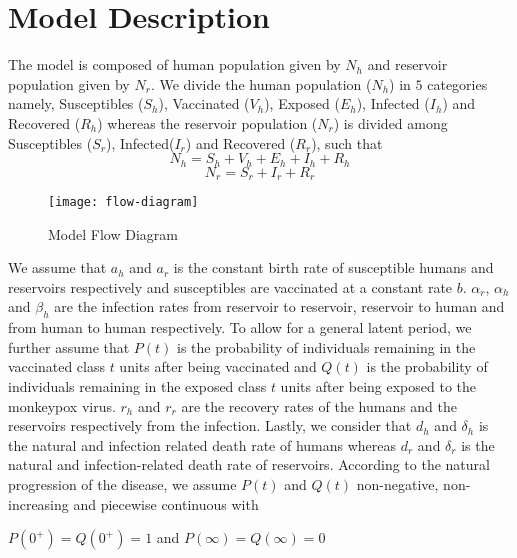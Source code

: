 \newcommand{\package}[1]{\textbf{#1}} %
\newcommand{\cmmd}[1]{\textbackslash\texttt{#1}} %


\chapter{Model Description}

The model is composed of human population given by $N_{h}$ and
reservoir population given by $N_{r}$. We divide the human population ($N_{h}$) in $5$ categories namely, Susceptibles ($S_{h}$), Vaccinated ($V_{h}$), Exposed ($E_{h}$), Infected ($I_{h}$) and Recovered ($R_{h}$) whereas the reservoir population ($N_{r}$) is divided among Susceptibles ($S_{r}$), Infected($I_{r}$) and Recovered ($R_{r}$), such that
\[N_{h} = S_{h} + V_{h} + E_{h} + I_{h} + R_{h}\]
\[N_{r} = S_{r} + I_{r} + R_{r}\]

\begin{figure}[h]
\texttt{[image: flow-diagram]}
\caption{Model Flow Diagram}
\centering
\end{figure}
We assume that $a_{h}$ and $a_{r}$ is the constant birth rate of susceptible humans and reservoirs respectively and susceptibles are vaccinated at a constant rate $b$. $\alpha_{r}$, $\alpha_{h}$ and $\beta_{h}$ are the infection rates from reservoir to reservoir, reservoir to human and from human to human respectively.
To allow for a general latent period, we further assume that $P(t)$ is the probability of individuals remaining in the vaccinated class $t$ units after being vaccinated and $Q(t)$ is the probability of individuals remaining in the exposed class $t$ units after being exposed to the monkeypox virus. $r_{h}$ and $r_{r}$ are the recovery rates of the humans and the reservoirs respectively from the infection. Lastly, we consider that $d_{h}$ and $\delta_{h}$ is the natural and infection related death rate of humans whereas $d_{r}$ and $\delta_{r}$ is the natural and infection-related death rate of reservoirs.
According to the natural progression of the disease, we assume $P(t)$ and $Q(t)$ non-negative, non-increasing and piecewise continuous with 
\begin{center}
$P(0^{+}) = Q(0^{+}) = 1$ and $P(\infty) = Q(\infty) = 0$
\end{center}

